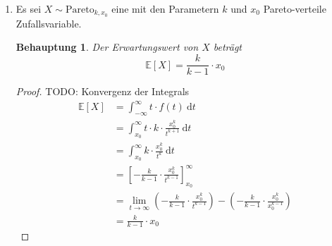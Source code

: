 \documentclass[a4paper]{scrartcl}
\newtheorem*{behaupt}{Behauptung}
\newcommand{\dif}{\ \mathrm{d}}
\newcommand{\e}{\mathbb{E}}
\def \blattnr {11}
\begin{document}
\begin{enumerate}[label=\bfseries \blattnr.\arabic*]
\begin{enumerate}
            \item
                Es sei $X \sim \mathrm{Pareto}_{k,x_0}$ eine mit den Parametern
                $k$ und $x_0$ Pareto-verteile Zufallsvariable.
                \begin{behaupt}
                    Der Erwartungswert von $X$ beträgt
                    \begin{equation*}
                        \e[X] = \frac{k}{k-1} \cdot x_0
                    \end{equation*}
                \end{behaupt}
                \begin{proof}
                    TODO: Konvergenz der Integrals
                    \begin{equation*}
                        \begin{split}
                            \e[X]
                            &= \int_{-\infty}^\infty t \cdot f(t) \dif t \\
                            &= \int_{x_0}^\infty t \cdot k \cdot \frac{x_0^k}{t^{k+1}} \dif t \\
                            &= \int_{x_0}^\infty k \cdot \frac{x_0^k}{t^k} \dif t \\
                            &= \left[ -\frac{k}{k-1} \cdot \frac{x_0^k}{t^{k-1}} \right]_{x_0}^\infty \\
                            &= \lim_{t \to \infty} \left( -\frac{k}{k-1} \cdot \frac{x_0^k}{t^{k-1}} \right) - \left( -\frac{k}{k-1} \cdot \frac{x_0^k}{x_0^{k-1}} \right) \\
                            &= \frac{k}{k-1} \cdot x_0
                        \end{split}
                    \end{equation*}
                \end{proof}

        \end{enumerate}

\end{enumerate}
\end{document}
